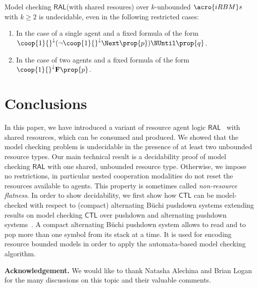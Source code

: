 \documentclass{llncs}
\newcommand{\coopdown}[2][]{\ensuremath{\coop{#2}{}_{#1}^{\downarrow}}}
\newcommand{\rbmi}{\acro{iRBM}}
\newcommand{\ral}{\ensuremath{\mathsf{RAL}}\xspace}
\renewcommand{\CTL}{\ensuremath{\mathsf{CTL}}\xspace}
\begin{document}
{\begin{corollary}Model checking \ral  (with shared resoures) over $k$-unbounded ${\rbmi}s$ with $k\geq 2$ is undecidable, even in the following restricted cases:
\begin{enumerate}
\item In the case of a single agent and a fixed formula of the form $\coopdown{1}(\neg\coopdown{1}\Next\prop{p})\NUntil\prop{q}$.
\item In the case of two agents and a fixed formula of the form $\coopdown{1}\mathbf{F}\prop{p}$.
\end{enumerate}
\end{corollary}}


\vspace{-0.7cm}

\section{Conclusions}\label{sec:concl}
In this paper, we have introduced a variant of resource agent logic \ral~\cite{Bulling/Farwer:10a} with shared resources, which can be consumed and produced. We showed that the model checking problem is undecidable in the presence of at least two unbounded resource types. Our main technical result is a decidability proof of model checking \ral with one shared, unbounded resource type. Otherwise, we impose no restrictions, in particular nested cooperation modalities do not reset the resources available to agents. This property is sometimes called \emph{non-resource flatness}. In order to show decidability, we first
show how \CTL can be model-checked with respect to (compact) alternating B\"{u}chi pushdown systems extending results on model checking \CTL over pushdown and alternating pushdown systems~\cite{song2014efficient,bouajjani1997reachability}. A compact alternating B\"{u}chi pushdown system allows to read and to pop more than one symbol from its stack at a time. It is used for  encoding resource bounded models in order to apply the automata-based model checking algorithm.  

\textbf{Acknowledgement.} We would like to thank Natasha Alechina and Brian Logan for the many discussions on this topic and their valuable comments.



 \vspace{-0.5cm}
\end{document}
